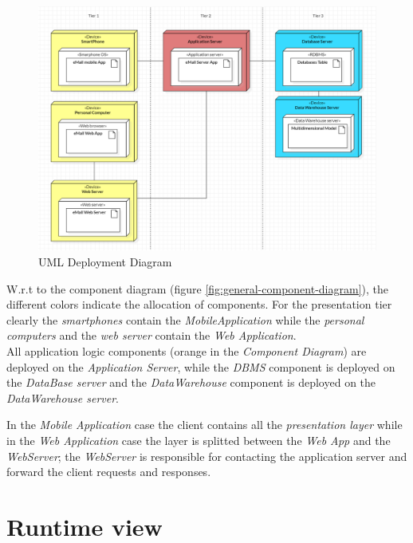 \documentclass[a4paper]{report}
\begin{document}
\begin{figure}[htp]
\centering
\includegraphics[scale=0.6]{img/DEPLOYMENT DIAGRAM.png}
\caption{UML Deployment Diagram}
\label{fig:deployment-diagram}
\end{figure}

W.r.t to the component diagram (figure \ref{fig:general-component-diagram}), the different colors indicate the allocation of components.
For the presentation tier clearly the \textit{smartphones} contain the \textit{MobileApplication} while the \textit{personal computers} and the \textit{web server} contain the \textit{Web Application}.\\
All application logic components (orange in the \textit{Component Diagram}) are deployed on the \textit{Application Server}, while the \textit{DBMS} component is deployed on the \textit{DataBase server} and the \textit{DataWarehouse} component is deployed on the \textit{DataWarehouse server}.

In the \textit{Mobile Application} case the client contains all the \textit{presentation layer} while in the \textit{Web Application} case the layer is splitted between the \textit{Web App} and the \textit{WebServer}; the \textit{WebServer} is responsible for contacting the application server and forward the client requests and responses.\\

\section{Runtime view}
\end{document}
